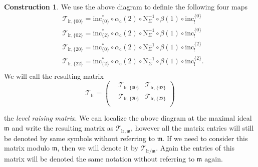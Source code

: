 \documentclass[10pt]{amsart}
\numberwithin{equation}{section}
\theoremstyle{definition}
\newtheorem{construction}[equation]{Construction}
\def\calT{\mathcal{T}}
\def\fracm{\mathfrak{m}}
\def\rmc{\mathrm{c}}
\def\rmN{\mathrm{N}}
\begin{document}
\begin{construction}
We use the above diagram to definie the following four maps
\begin{equation*}
\begin{aligned}
&\calT_{\mathrm{lr},\{00\}}= \mathrm{inc}^{\ast}_{\{0\}} \circ\alpha_{\rmc}(2)\circ\rmN^{-1}_{\Sigma}\circ\beta(1)\circ\mathrm{inc}^{\{0\}}_{!}\\
&\calT_{\mathrm{lr},\{02\}}= \mathrm{inc}^{\ast}_{\{2\}} \circ\alpha_{\rmc}(2)\circ\rmN^{-1}_{\Sigma}\circ\beta(1)\circ\mathrm{inc}^{\{0\}}_{!}\\
&\calT_{\mathrm{lr},\{20\}}= \mathrm{inc}^{\ast}_{\{0\}} \circ\alpha_{\rmc}(2)\circ\rmN^{-1}_{\Sigma}\circ\beta(1)\circ\mathrm{inc}^{\{2\}}_{!}\\
&\calT_{\mathrm{lr},\{22\}}= \mathrm{inc}^{\ast}_{\{2\}} \circ\alpha_{\rmc}(2)\circ\rmN^{-1}_{\Sigma}\circ\beta(1)\circ\mathrm{inc}^{\{2\}}_{!}.\\
\end{aligned}
\end{equation*}
We will call the resulting matrix
\begin{equation*}
\calT_{\mathrm{lr}}=\begin{pmatrix} &\calT_{\mathrm{lr},\{00\}} & \calT_{\mathrm{lr}, \{02\}}\\ &\calT_{\mathrm{lr}, \{20\}}& \calT_{\mathrm{lr}, \{22\}}\\ \end{pmatrix}
\end{equation*}
\end{construction}
the {\em level raising matrix}. We can localize the above diagram at the maximal ideal $\fracm$ and write the resulting matrix as $\calT_{\mathrm{lr},\fracm}$, however all the matrix entries will still be denoted by same symbols without referring to $\fracm$. If we need to consider this matrix modulo $\fracm$, then we will denote it by $\calT_{\mathrm{lr}/\fracm}$. Again the entries of this matrix will be denoted the same notation without referring to $\fracm$ again.
\end{document}

